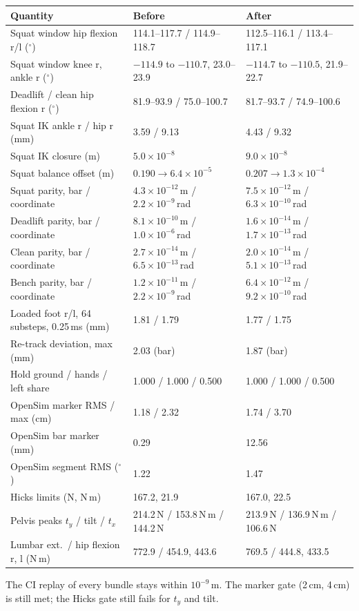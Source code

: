 \documentclass[11pt,a4paper]{article}
\begin{document}
\begin{center}\footnotesize\setlength{\tabcolsep}{3pt}
\begin{tabular}{lll}
\toprule
Quantity & Before & After\\
\midrule
Squat window hip flexion r/l ($^\circ$) & 114.1--117.7 / 114.9--118.7 & 112.5--116.1 / 113.4--117.1\\
Squat window knee r, ankle r ($^\circ$) & $-114.9$ to $-110.7$, 23.0--23.9 & $-114.7$ to $-110.5$, 21.9--22.7\\
Deadlift / clean hip flexion r ($^\circ$) & 81.9--93.9 / 75.0--100.7 & 81.7--93.7 / 74.9--100.6\\
Squat IK ankle r / hip r (mm) & 3.59 / 9.13 & 4.43 / 9.32\\
Squat IK closure (m) & $5.0\times10^{-8}$ & $9.0\times10^{-8}$\\
Squat balance offset (m) & $0.190\to6.4\times10^{-5}$ & $0.207\to1.3\times10^{-4}$\\
Squat parity, bar / coordinate & $4.3\times10^{-12}$\,m / $2.2\times10^{-9}$\,rad & $7.5\times10^{-12}$\,m / $6.3\times10^{-10}$\,rad\\
Deadlift parity, bar / coordinate & $8.1\times10^{-10}$\,m / $1.0\times10^{-6}$\,rad & $1.6\times10^{-14}$\,m / $1.7\times10^{-13}$\,rad\\
Clean parity, bar / coordinate & $2.7\times10^{-14}$\,m / $6.5\times10^{-13}$\,rad & $2.0\times10^{-14}$\,m / $5.1\times10^{-13}$\,rad\\
Bench parity, bar / coordinate & $1.2\times10^{-11}$\,m / $2.2\times10^{-9}$\,rad & $6.4\times10^{-12}$\,m / $9.2\times10^{-10}$\,rad\\
Loaded foot r/l, 64 substeps, 0.25\,ms (mm) & 1.81 / 1.79 & 1.77 / 1.75\\
Re-track deviation, max (mm) & 2.03 (bar) & 1.87 (bar)\\
Hold ground / hands / left share & 1.000 / 1.000 / 0.500 & 1.000 / 1.000 / 0.500\\
OpenSim marker RMS / max (cm) & 1.18 / 2.32 & 1.74 / 3.70\\
OpenSim bar marker (mm) & 0.29 & 12.56\\
OpenSim segment RMS ($^\circ$) & 1.22 & 1.47\\
Hicks limits (N, N\,m) & 167.2, 21.9 & 167.0, 22.5\\
Pelvis peaks $t_y$ / tilt / $t_x$ & 214.2\,N / 153.8\,N\,m / 144.2\,N & 213.9\,N / 136.9\,N\,m / 106.6\,N\\
Lumbar ext.\ / hip flexion r, l (N\,m) & 772.9 / 454.9, 443.6 & 769.5 / 444.8, 433.5\\
\bottomrule
\end{tabular}
\end{center}
The CI replay of every bundle stays within $10^{-9}$\,m. The marker gate
(2\,cm, 4\,cm) is still met; the Hicks gate still fails for $t_y$ and tilt.
\end{document}
